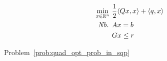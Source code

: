 \begin{definition}
\begin{align}
  \min_{x \in \mathbb{R}^n}\ &
    \frac{1}{2} \langle Qx,x \rangle + \langle q,x \rangle \\
  \text{\em Nb. } & Ax = b \notag \\
      & Gx \leq r \notag
\end{align}
\end{definition}

Problem~\eqref{prob:quad_opt_prob_in_sqp}